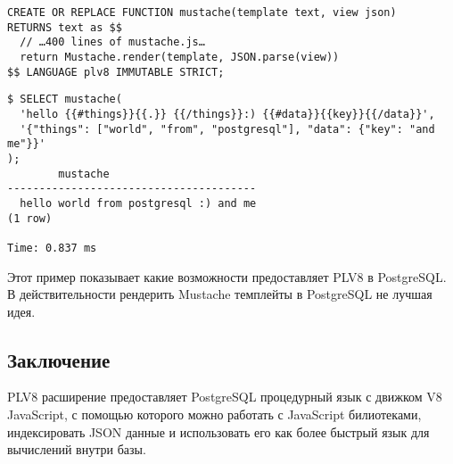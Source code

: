 \begin{lstlisting}[label=lst:plv8js15,caption=Функция для рендера Mustache темплейтов]
CREATE OR REPLACE FUNCTION mustache(template text, view json)
RETURNS text as $$
  // …400 lines of mustache.js…
  return Mustache.render(template, JSON.parse(view))
$$ LANGUAGE plv8 IMMUTABLE STRICT;
\end{lstlisting}

\begin{lstlisting}[label=lst:plv8js16,caption=Рендер темплейтов]
$ SELECT mustache(
  'hello {{#things}}{{.}} {{/things}}:) {{#data}}{{key}}{{/data}}',
  '{"things": ["world", "from", "postgresql"], "data": {"key": "and me"}}'
);
		mustache
---------------------------------------
  hello world from postgresql :) and me
(1 row)

Time: 0.837 ms
\end{lstlisting}

Этот пример показывает какие возможности предоставляет PLV8 в PostgreSQL. В действительности рендерить Mustache темплейты в PostgreSQL не лучшая идея.

\subsection{Заключение}

PLV8 расширение предоставляет PostgreSQL процедурный язык с движком V8 JavaScript, с помощью которого можно работать с JavaScript билиотеками, индексировать JSON данные и использовать его как более быстрый язык для вычислений внутри базы.
